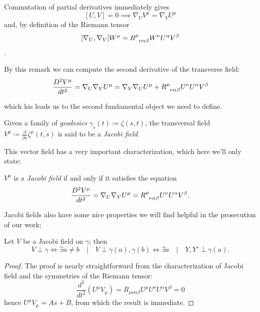 

\begin{remark}
	Commutation of partial derivatives immediately gives 
	\[
	[U, V] = 0 \implies \nabla_U V^{\mu} = \nabla_V U^{\mu}
	\]
	and, by definition of the Riemann tensor
	\[
	[\nabla_U, \nabla_V]W^{\mu} = R\indices{^{\mu}_{\nu\alpha\beta}}W^{\nu}U^{\alpha}V^{\beta}
	\].
\end{remark}

By this remark we can compute the second derivative of the transverse field:
\[
\frac{D^2\tensor{V}{^\mu} }{dt^2} = \nabla_U\nabla_V U^{\mu} = \nabla_V\nabla_U U^{\mu} + R\indices{^{\mu}_{\nu\alpha\beta}}U^{\nu}U^{\alpha}V^{\beta}
\]

which his leads us to the second fundamental object we need to define. 
\begin{definition}
	Given a family of \emph{geodesics} \(\gamma_s(t) \coloneqq \zeta(s,t)\), the transversal field \(V^{\mu} \coloneqq \frac{\partial}{\partial s} \zeta^{\mu}(t,s)\) is said to be a \emph{Jacobi field}.
\end{definition}

This vector field has a very important characterization, which here we'll only state:
\begin{lemma}
\(V^{\mu}\) is a \emph{Jacobi field} if and only if it satisfies the equation
	\begin{equation}
	\label{eq:Jacobi}
		\frac{D^2\tensor{V}{^\mu} }{dt^2} = \nabla_U\nabla_V U^{\mu} =  R\indices{^{\mu}_{\nu\alpha\beta}}U^{\nu}U^{\alpha}V^{\beta}.
	\end{equation}
\end{lemma}

Jacobi fields also have some nice properties we will find helpful in the prosecution of our work;
\begin{lemma}
	\label{lemma:Jacobi-fields-properties}
	Let \(V\) be a Jacobi field on \(\gamma\); then
	\[
	V \perp \gamma \iff \exists a\neq b \quad\vert\quad V\perp \gamma(a),\gamma(b) \iff \exists a \quad\vert\quad Y, Y' \perp \gamma(a).
	\]
\end{lemma}
\begin{proof}
	The proof is nearly straightforward from the characterization of Jacobi field and the symmetries of the Riemann tensor:
	\[
	\frac{d^2}{dt^2} (U^{\mu}V_{\mu}) = R_{\mu\nu\alpha\beta}U^{\mu}U^{\nu}U^{\alpha}V^{\beta} = 0
	\]
	hence \(U^{\mu}V_{\mu} = As + B\), from which the result is immediate.
\end{proof}

